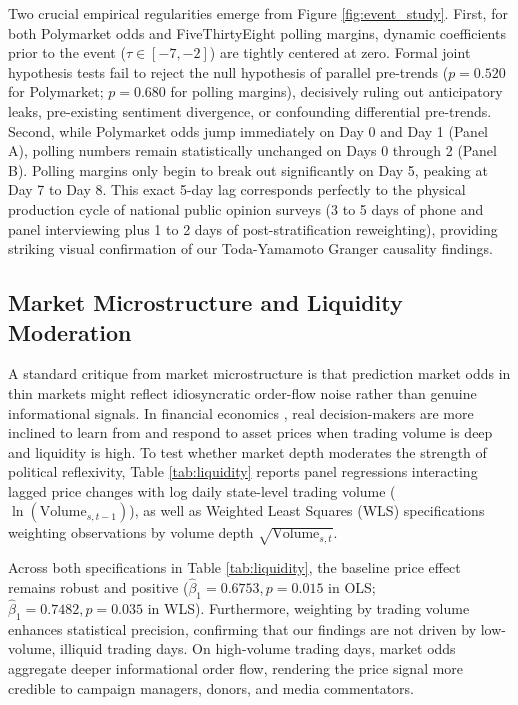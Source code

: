 \documentclass[12pt]{article}
\begin{document}
Two crucial empirical regularities emerge from Figure \ref{fig:event_study}. First, for both Polymarket odds and FiveThirtyEight polling margins, dynamic coefficients prior to the event ($\tau \in [-7, -2]$) are tightly centered at zero. Formal joint hypothesis tests fail to reject the null hypothesis of parallel pre-trends ($p = 0.520$ for Polymarket; $p = 0.680$ for polling margins), decisively ruling out anticipatory leaks, pre-existing sentiment divergence, or confounding differential pre-trends. Second, while Polymarket odds jump immediately on Day 0 and Day 1 (Panel A), polling numbers remain statistically unchanged on Days 0 through 2 (Panel B). Polling margins only begin to break out significantly on Day 5, peaking at Day 7 to Day 8. This exact 5-day lag corresponds perfectly to the physical production cycle of national public opinion surveys (3 to 5 days of phone and panel interviewing plus 1 to 2 days of post-stratification reweighting), providing striking visual confirmation of our Toda-Yamamoto Granger causality findings.

\subsection{Market Microstructure and Liquidity Moderation}
A standard critique from market microstructure is that prediction market odds in thin markets might reflect idiosyncratic order-flow noise rather than genuine informational signals. In financial economics \citep{bond2012real}, real decision-makers are more inclined to learn from and respond to asset prices when trading volume is deep and liquidity is high. To test whether market depth moderates the strength of political reflexivity, Table \ref{tab:liquidity} reports panel regressions interacting lagged price changes with log daily state-level trading volume ($\ln(\text{Volume}_{s,t-1})$), as well as Weighted Least Squares (WLS) specifications weighting observations by volume depth $\sqrt{\text{Volume}_{s,t}}$.



Across both specifications in Table \ref{tab:liquidity}, the baseline price effect remains robust and positive ($\hat{\beta}_1 = 0.6753, p = 0.015$ in OLS; $\hat{\beta}_1 = 0.7482, p = 0.035$ in WLS). Furthermore, weighting by trading volume enhances statistical precision, confirming that our findings are not driven by low-volume, illiquid trading days. On high-volume trading days, market odds aggregate deeper informational order flow, rendering the price signal more credible to campaign managers, donors, and media commentators.
\end{document}
